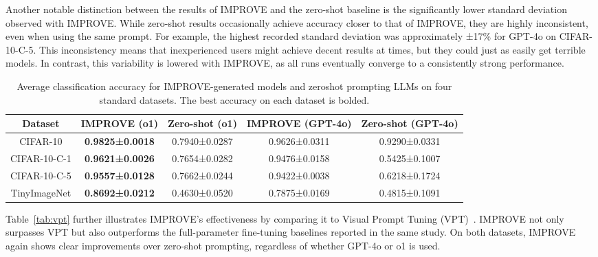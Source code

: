 Another notable distinction between the results of IMPROVE and the zero-shot baseline is the significantly lower standard deviation observed with IMPROVE. While zero-shot results occasionally achieve accuracy closer to that of IMPROVE, they are highly inconsistent, even when using the same prompt. For example, the highest recorded standard deviation was approximately ±17\% for GPT-4o on CIFAR-10-C-5. This inconsistency means that inexperienced users might achieve decent results at times, but they could just as easily get terrible models. In contrast, this variability is lowered with IMPROVE, as all runs eventually converge to a consistently strong performance.

\begin{table*}[ht]
\centering
\caption{Average classification accuracy for IMPROVE-generated models and zeroshot prompting LLMs on four standard datasets. The best accuracy on each dataset is bolded.}
\label{tab:zeroshot}
\begin{tabular}{@{}ccccc@{}}
\toprule
Dataset & IMPROVE (o1) & \multicolumn{1}{l}{Zero-shot (o1)} & IMPROVE (GPT-4o) & Zero-shot (GPT-4o) \\ \midrule
CIFAR-10     & \textbf{0.9825±0.0018} & 0.7940±0.0287 & 0.9626±0.0311 & 0.9290±0.0331 \\
CIFAR-10-C-1 & \textbf{0.9621±0.0026} & 0.7654±0.0282 & 0.9476±0.0158 & 0.5425±0.1007 \\
CIFAR-10-C-5 & \textbf{0.9557±0.0128} & 0.7662±0.0244 & 0.9422±0.0038 & 0.6218±0.1724 \\
TinyImageNet & \textbf{0.8692±0.0212} & 0.4630±0.0520 & 0.7875±0.0169 & 0.4815±0.1091 \\ \bottomrule
\end{tabular}
\end{table*}

Table~\ref{tab:vpt} further illustrates IMPROVE’s effectiveness by comparing it to Visual Prompt Tuning (VPT)~\citep{jia2022vpt}. IMPROVE not only surpasses VPT but also outperforms the full-parameter fine-tuning baselines reported in the same study. On both datasets, IMPROVE again shows clear improvements over zero-shot prompting, regardless of whether GPT-4o or o1 is used.

